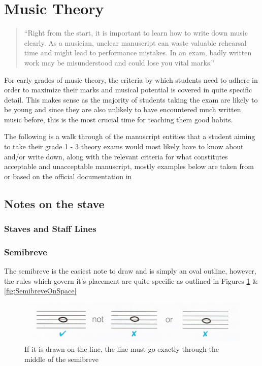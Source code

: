\section{Music Theory}

\blockquote{``Right from the start, it is important to learn how to write down music clearly. As a musician, unclear manuscript can waste valuable rehearsal time and might lead to performance mistakes. In an exam, badly written work may be misunderstood and could lose you vital marks.'' \parencite{taylor1989ab}}

For early grades of music theory, the criteria by which students need to adhere in order to maximize their marks and musical potential is covered in quite specific detail. This makes sense as the majority of students taking the exam are likely to be young and since they are also unlikely to have encountered much written music before, this is the most crucial time for teaching them good habits.

The following is a walk through of the manuscript entities that a student aiming to take their grade 1 - 3 theory exams would most likely have to know about and/or write down, along with the relevant criteria for what constitutes acceptable and unacceptable manuscript, mostly examples below are taken from or based on the official documentation in \parencite{taylor2008music}


\subsection{Notes on the stave}

\subsubsection{Staves and Staff Lines}
\label{sec:music-theory-stave}

\subsubsection{Semibreve}

The semibreve is the easiest note to draw and is simply an oval outline, however, the rules which govern it's placement are quite specific as outlined in Figures \ref{fig:SemibreveOnLine} \& \ref{fig:SemibreveOnSpace}

\begin{figure}[h!]
  \includegraphics[width=\linewidth]{gfx/basic/semibreve-on-line.png}
  \centering
  \caption{If it is drawn on the line, the line must go exactly through the middle of the semibreve}
  \label{fig:SemibreveOnLine}
\end{figure}

